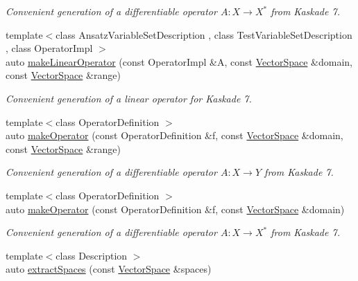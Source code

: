 \begin{DoxyCompactItemize}
\begin{DoxyCompactList}\small\item\em Convenient generation of a differentiable operator $A: X\rightarrow X^*$ from Kaskade 7. \end{DoxyCompactList}\item 
{\footnotesize template$<$class Ansatz\+Variable\+Set\+Description , class Test\+Variable\+Set\+Description , class Operator\+Impl $>$ }\\auto \hyperlink{group__KaskadeGroup_ga6bd8e1d7fdd3066ecd7ed14f0a239912_ga6bd8e1d7fdd3066ecd7ed14f0a239912}{make\+Linear\+Operator} (const Operator\+Impl \&A, const \hyperlink{classSpacy_1_1VectorSpace}{Vector\+Space} \&domain, const \hyperlink{classSpacy_1_1VectorSpace}{Vector\+Space} \&range)
\begin{DoxyCompactList}\small\item\em Convenient generation of a linear operator for Kaskade 7. \end{DoxyCompactList}\item 
{\footnotesize template$<$class Operator\+Definition $>$ }\\auto \hyperlink{group__KaskadeGroup_ga0e8d7d2c51e429e22561ef813fc97589_ga0e8d7d2c51e429e22561ef813fc97589}{make\+Operator} (const Operator\+Definition \&f, const \hyperlink{classSpacy_1_1VectorSpace}{Vector\+Space} \&domain, const \hyperlink{classSpacy_1_1VectorSpace}{Vector\+Space} \&range)
\begin{DoxyCompactList}\small\item\em Convenient generation of a differentiable operator $A: X\rightarrow Y$ from Kaskade 7. \end{DoxyCompactList}\item 
{\footnotesize template$<$class Operator\+Definition $>$ }\\auto \hyperlink{group__KaskadeGroup_ga3afbd00437ea7bdb406f3d9a1f375522_ga3afbd00437ea7bdb406f3d9a1f375522}{make\+Operator} (const Operator\+Definition \&f, const \hyperlink{classSpacy_1_1VectorSpace}{Vector\+Space} \&domain)
\begin{DoxyCompactList}\small\item\em Convenient generation of a differentiable operator $A: X\rightarrow X^*$ from Kaskade 7. \end{DoxyCompactList}\item 
\hypertarget{group__KaskadeGroup_ga2354f9e41ef04d4ea06b28b719668c96}{}{\footnotesize template$<$class Description $>$ }\\auto \hyperlink{group__KaskadeGroup_ga2354f9e41ef04d4ea06b28b719668c96}{extract\+Spaces} (const \hyperlink{classSpacy_1_1VectorSpace}{Vector\+Space} \&spaces)\label{group__KaskadeGroup_ga2354f9e41ef04d4ea06b28b719668c96}


\end{DoxyCompactItemize}
